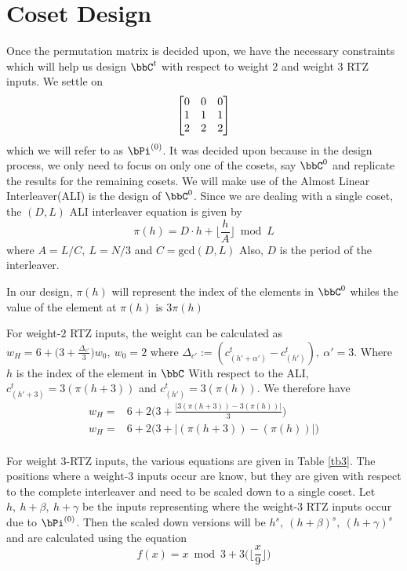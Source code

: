 \documentclass[11pt, oneside, dvipdfmx]{book}
\begin{document}
\section{Coset Design}
Once the permutation matrix is decided upon, we have the necessary constraints which will help us design $\bbC^t$ with respect to weight $2$ and weight $3$ RTZ inputs.
We settle on $$\begin{bmatrix} 0 & 0 & 0 \cr 1 & 1 & 1 \cr 2 & 2 & 2\end{bmatrix}$$ which we will refer to as $\bPi^{(0)}$. It was decided upon because in the design process, we only need to focus on only one of the cosets, say $\bbC^0$ and replicate the results for the remaining cosets. We will make use of the Almost Linear Interleaver(ALI) is the design of $\bbC^0$. 
Since we are dealing with a single coset, the $(D,L)$ ALI interleaver equation is given by $$\pi(h)=D \cdot h + \Big\lfloor \frac{h}{A} \Big\rfloor \bmod L$$ where $A=L/C,~L=N/3$ and $C=\text{gcd}(D,L)$ Also, $D$ is the period of the interleaver.

In our design, $\pi(h)$ will represent the index of the elements in $\bbC^0$ whiles the value of the element at $\pi(h)$ is $3\pi(h)$

For weight-$2$ RTZ inputs, the weight can be calculated as
$
w_H=6+\Big(3+\frac{\Delta_{c'}}{3}\Big)w_0,~w_0=2
$ 
where
$\Delta_{c'}:=(c_{(h'+\alpha')}^{t}-c_{(h')}^{t}),~\alpha' =3$. Where $h$ is the index of the element in $\bbC$
 With respect to the ALI, $c_{(h'+3)}^{t}=3(\pi(h+3))$ and $c_{(h')}^{t}=3(\pi(h))$.
 We therefore have 
 \begin{equation}
 \begin{split}
 w_H=&6+2\Big(3+\frac{|3(\pi(h+3))- 3(\pi(h))|}{3}\Big)\\
  w_H=&6+2\Big(3+|(\pi(h+3))- (\pi(h))|\Big)\\
 \end{split}
 \label{eq8}
 \end{equation}
 
 For weight $3$-RTZ inputs, the various equations are given in Table \ref{tb3}. The positions where a weight-$3$ inputs occur are know, but they are given with respect to the complete interleaver and need to be scaled down to a single coset. 
 Let $h,~h+\beta,~h+\gamma$ be the inputs representing where the weight-$3$ RTZ inputs occur due to $\bPi^{(0)}$. Then the scaled down versions will be $h^s,~(h+\beta)^s,~(h+\gamma)^s$ and are calculated using the equation
 $$f(x)= x \bmod 3 + 3\Big(\Big\lfloor\frac{x}{9} \Big\rfloor\Big)$$
 
\end{document}
